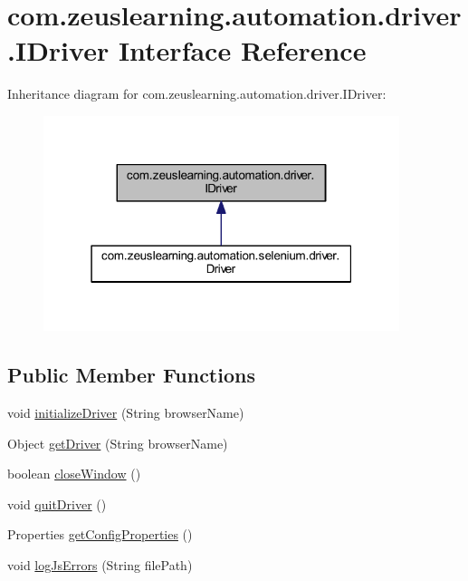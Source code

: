 \hypertarget{interfacecom_1_1zeuslearning_1_1automation_1_1driver_1_1IDriver}{}\section{com.\+zeuslearning.\+automation.\+driver.\+I\+Driver Interface Reference}
\label{interfacecom_1_1zeuslearning_1_1automation_1_1driver_1_1IDriver}


Inheritance diagram for com.\+zeuslearning.\+automation.\+driver.\+I\+Driver\+:\nopagebreak
\begin{figure}[H]
\begin{center}
\leavevmode
\includegraphics[width=295pt]{dd/deb/interfacecom_1_1zeuslearning_1_1automation_1_1driver_1_1IDriver__inherit__graph}
\end{center}
\end{figure}
\subsection*{Public Member Functions}
\begin{DoxyCompactItemize}
\item 
void \hyperlink{interfacecom_1_1zeuslearning_1_1automation_1_1driver_1_1IDriver_a5662e9a248835364fcd27b0df392c3ea}{initialize\+Driver} (String browser\+Name)
\item 
Object \hyperlink{interfacecom_1_1zeuslearning_1_1automation_1_1driver_1_1IDriver_a9c4bbcfcf72e1b1f556c7c8298dc8e2a}{get\+Driver} (String browser\+Name)
\item 
boolean \hyperlink{interfacecom_1_1zeuslearning_1_1automation_1_1driver_1_1IDriver_a1efada042eeea9713b798f713bfad650}{close\+Window} ()
\item 
void \hyperlink{interfacecom_1_1zeuslearning_1_1automation_1_1driver_1_1IDriver_abf28b69bbf3db2e4f4727c3498ccde0f}{quit\+Driver} ()
\item 
Properties \hyperlink{interfacecom_1_1zeuslearning_1_1automation_1_1driver_1_1IDriver_a2530732df342f07743bed12deb55fee8}{get\+Config\+Properties} ()
\item 
void \hyperlink{interfacecom_1_1zeuslearning_1_1automation_1_1driver_1_1IDriver_ad474f0bb118dd3e0737e42a8c7a2f51e}{log\+Js\+Errors} (String file\+Path)
\end{DoxyCompactItemize}


